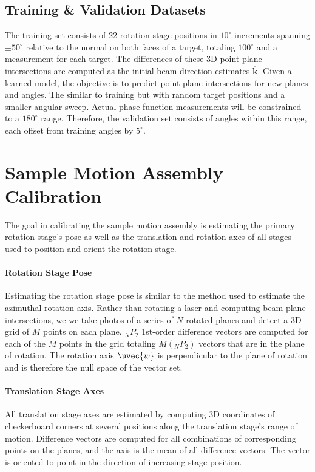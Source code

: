 \subsection{Training \& Validation Datasets}
The training set consists of 22 rotation stage positions in $10^\circ$ increments spanning $\pm 50^\circ$ relative to the normal on both faces of a target, totaling $100^\circ$ and a measurement for each target. The differences of these 3D point-plane intersections are computed as the initial beam direction estimates $\mathbf{\overline{k}}$. Given a learned model, the objective is to predict point-plane intersections for new planes and angles. The similar to training but with random target positions and a smaller angular sweep. Actual phase function measurements will be constrained to a $180^\circ$ range. Therefore, the validation set consists of angles within this range, each offset from training angles by $5^\circ$.

\section{Sample Motion Assembly Calibration}
The goal in calibrating the sample motion assembly is estimating the primary rotation stage's pose as well as the translation and rotation axes of all stages used to position and orient the rotation stage.

\paragraph{Rotation Stage Pose} Estimating the rotation stage pose is similar to the method used to estimate the azimuthal rotation axis. Rather than rotating a laser and computing beam-plane intersections, we we take photos of a series of $N$ rotated planes and detect a 3D grid of $M$ points on each plane. $_N P_2$ 1st-order difference vectors are computed for each of the $M$ points in the grid totaling $M(_N P_2)$ vectors that are in the plane of rotation. The rotation axis $\uvec{w}$ is perpendicular to the plane of rotation and is therefore the null space of the vector set.

\paragraph{Translation Stage Axes} \label{proc:translation_stage_calibration} All translation stage axes are estimated by computing 3D coordinates of checkerboard corners at several positions along the translation stage's range of motion. Difference vectors are computed for all combinations of corresponding points on the planes, and the axis is the mean of all difference vectors. The vector is oriented to point in the direction of increasing stage position.

